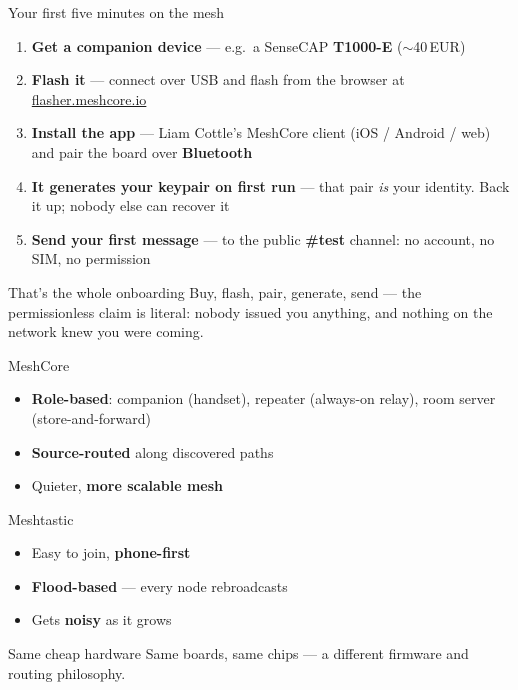 \documentclass[aspectratio=\baAspect,t,9pt]{beamer}
\newcommand{\bridgeslide}[4]{%
  \comparisonslide{#1}{Bitcoin}{#2}{MeshCore}{#3}{Where it breaks}{#4}}
\begin{document}
\begin{frame}{Your first five minutes on the mesh}
  \begin{enumerate}
    \item \textbf{Get a companion device} --- e.g.\ a SenseCAP \textbf{T1000-E}
      ($\sim$40\,EUR)
    \item \textbf{Flash it} --- connect over USB and flash from the browser at
      \href{https://flasher.meshcore.io/}{flasher.meshcore.io}
    \item \textbf{Install the app} --- Liam Cottle's MeshCore client
      (iOS / Android / web) and pair the board over \textbf{Bluetooth}
    \item \textbf{It generates your keypair on first run} --- that pair \emph{is}
      your identity. Back it up; nobody else can recover it
    \item \textbf{Send your first message} --- to the public \textbf{\#test}
      channel: no account, no SIM, no permission
  \end{enumerate}
  \vfill
  \begin{alertblock}{That's the whole onboarding}
    Buy, flash, pair, generate, send --- the permissionless claim is literal:
    nobody issued you anything, and nothing on the network knew you were coming.
  \end{alertblock}
\end{frame}

{}%
  {MeshCore}{%
    \begin{itemize}
      \item \textbf{Role-based}: companion (handset), repeater (always-on
        relay), room server (store-and-forward)
      \item \textbf{Source-routed} along discovered paths
      \item Quieter, \textbf{more scalable mesh}
    \end{itemize}}%
  {Meshtastic}{%
    \begin{itemize}
      \item Easy to join, \textbf{phone-first}
      \item \textbf{Flood-based} --- every node rebroadcasts
      \item Gets \textbf{noisy} as it grows
    \end{itemize}}%
  {Same cheap hardware}{%
    Same boards, same chips --- a different firmware and routing philosophy.}
\end{document}
